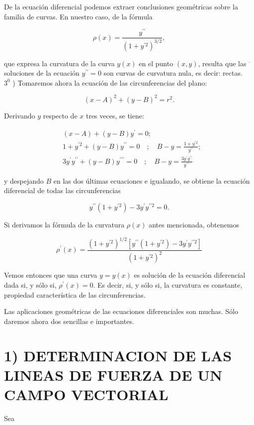 \documentclass[10pt]{article}
\theoremstyle{plain}
\theoremstyle{definition}
\theoremstyle{remark}
\begin{document}
De la ecuación diferencial podemos extraer conclusiones geométricas sobre la familia de curvas. En nuestro caso, de la fórmula

$$
\rho(x)=\frac{y^{\prime \prime}}{\left(1+y^{\prime 2}\right)^{3 / 2}},
$$

que expresa la curvatura de la curva $y(x)$ en el punto $(x, y)$, resulta que las ${ }^{\cdot}$ soluciones de la ecuación $y^{\prime \prime}=0$ son curvas de curvatura nula, es decir: rectas.\\
$3^{0}$ ) Tomaremos ahora la ecuación de las circunferencias del plano:

$$
(x-A)^{2}+(y-B)^{2}=r^{2} .
$$

Derivando $y$ respecto de $x$ tres veces, se tiene:

$$
\begin{aligned}
& (x-A)+(y-B) y^{\prime}=0 ; \\
& 1+y^{\prime 2}+(y-B) y^{\prime \prime}=0 \quad ; \quad B-y=\frac{1+y^{\prime 2}}{y^{\prime \prime}} ; \\
& 3 y^{\prime} y^{\prime \prime}+(y-B) y^{\prime \prime \prime}=0 \quad ; \quad B-y=\frac{3 y^{\prime} y^{\prime \prime}}{y^{\prime \prime \prime}}
\end{aligned}
$$

y despejando $B$ en las dos últimas ecuaciones e igualando, se obtiene la ecuación diferencial de todas las circunferencias

$$
y^{\prime \prime}\left(1+y^{\prime 2}\right)-3 y^{\prime} y^{\prime \prime 2}=0 .
$$

Si derivamos la fórmula de la curvatura $\rho(x)$ antes mencionada, obtenemos

$$
\rho^{\prime}(x)=\frac{\left(1+y^{\prime 2}\right)^{1 / 2}\left[y^{\prime \prime}\left(1+y^{\prime 2}\right)-3 y^{\prime} y^{\prime \prime 2}\right]}{\left(1+y^{\prime 2}\right)^{2}}
$$

Vemos entonces que una curva $y=y(x)$ es solución de la ecuación diferencial dada si, y sólo si, $\rho^{\prime}(x)=0$. Es decir, si, y sólo si, la curvatura es constante, propiedad característica de las circunferencias.

Las aplicaciones geométricas de las ecuaciones diferenciales son muchas. Sólo daremos ahora dos sencillas e importantes.

\section*{1) DETERMINACION DE LAS LINEAS DE FUERZA DE UN CAMPO VECTORIAL}
Sea
\end{document}
